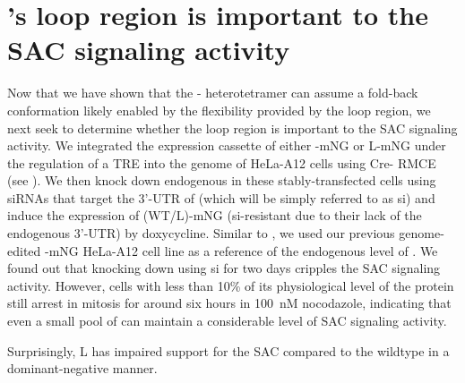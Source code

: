 \section{'s loop region is important to the SAC signaling activity }
\label{LoopDeletionSection}

Now that we have shown that the - heterotetramer can assume a fold-back conformation likely enabled by the flexibility provided by the loop region, we next seek to determine whether the loop region is important to the SAC signaling activity. We integrated the expression cassette of either -mNG or \textDelta{}L-mNG under the regulation of a TRE into the genome of HeLa-A12 cells using Cre- RMCE (see ). We then knock down endogenous  in these stably-transfected cells using siRNAs that target the 3'-UTR of  \cite{siMAD1-3UTR} (which will be simply referred to as si) and induce the expression of (WT/\textDelta{}L)-mNG (si-resistant due to their lack of the endogenous 3'-UTR) by doxycycline. Similar to , we used our previous genome-edited -mNG HeLa-A12 cell line as a reference of the endogenous level of . We found out that knocking down  using si for two days cripples the SAC signaling activity. However, cells with less than 10\% of its physiological level of the  protein still arrest in mitosis for around six hours in \SI{100}{nM} nocodazole, indicating that even a small pool of  can maintain a considerable level of SAC signaling activity.

Surprisingly, \textDelta{}L has impaired support for the SAC compared to the wildtype  in a dominant-negative manner. 